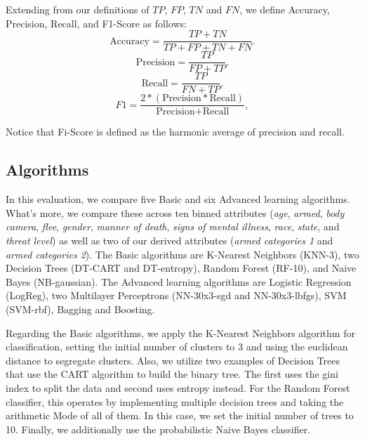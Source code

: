 \documentclass[10pt, conference, compsocconf]{IEEEtran}
\begin{document}
Extending from our definitions of $TP$, $FP$, $TN$ and $FN$, we define Accuracy, Precision, Recall, and F1-Score as follows:
\begin{equation}
\text{Accuracy} = \frac{TP + TN}{TP + FP + TN + FN}.
\end{equation}
\begin{equation}
\text{Precision} = \frac{TP}{FP + TP}.
\end{equation}
\begin{equation}
\text{Recall} = \frac{TP}{FN + TP}.
\end{equation}
\begin{equation}
F1=\frac{2*(\text{Precision}* \text{Recall})}{\text{Precision}+\text{Recall}},
\end{equation}

\noindent Notice that Fi-Score is defined as the harmonic average of precision and recall.

\subsection{Algorithms}

In this evaluation, we compare five Basic and six Advanced learning algorithms. What's more, we compare these across ten binned attributes (\textit{age}, \textit{armed}, \textit{body camera}, \textit{flee}, \textit{gender}, \textit{manner of death}, \textit{signs of mental illness}, \textit{race}, \textit{state}, and \textit{threat level}) as well as two of our derived attributes (\textit{armed categories 1 }and \textit{armed categories 2}). The Basic algorithms are K-Nearest Neighbors (KNN-3), two Decision Trees (DT-CART and DT-entropy), Random Forest (RF-10), and Naive Bayes (NB-gaussian). The Advanced learning algorithms are Logistic Regression (LogReg), two Multilayer Perceptrons (NN-30x3-sgd and NN-30x3-lbfgs), SVM (SVM-rbf), Bagging and Boosting.  

Regarding the Basic algorithms, we apply the K-Nearest Neighbors algorithm for classification, setting the initial number of clusters to 3 and using the euclidean distance to segregate clusters. Also, we utilize two examples of Decision Trees that use the CART algorithm to build the binary tree. The first uses the gini index to split the data and second uses entropy instead. For the Random Forest classifier, this operates by implementing multiple decision trees and taking the arithmetic Mode of all of them. In this case, we set the initial number of trees to 10. Finally, we additionally use the probabilistic Naive Bayes classifier. 
\end{document}

